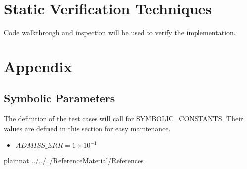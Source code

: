 \documentclass[12pt, titlepage]{article}
\begin{document}
\section{Static Verification Techniques}

Code walkthrough and inspection will be used to verify the implementation.
				


\newpage

\section{Appendix}



\subsection{Symbolic Parameters}

The definition of the test cases will call for SYMBOLIC\_CONSTANTS.
Their values are defined in this section for easy maintenance.
\begin{itemize}
	\item $ADMISS\_ERR = 1 \times 10^{-1}$
\end{itemize}





 {plainnat}
 {../../../ReferenceMaterial/References}
\end{document}
